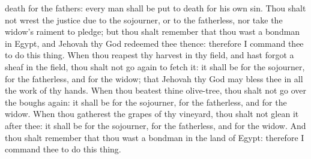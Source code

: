 death for the fathers: every man shall be put to death for his own sin.  Thou shalt not wrest the justice due to the sojourner, or to the fatherless, nor take the widow’s raiment to pledge; but thou shalt remember that thou wast a bondman in Egypt, and Jehovah thy God redeemed thee thence: therefore I command thee to do this thing.  When thou reapest thy harvest in thy field, and hast forgot a sheaf in the field, thou shalt not go again to fetch it: it shall be for the sojourner, for the fatherless, and for the widow; that Jehovah thy God may bless thee in all the work of thy hands. When thou beatest thine olive-tree, thou shalt not go over the boughs again: it shall be for the sojourner, for the fatherless, and for the widow. When thou gatherest the grapes of thy vineyard, thou shalt not glean it after thee: it shall be for the sojourner, for the fatherless, and for the widow. And thou shalt remember that thou wast a bondman in the land of Egypt: therefore I command thee to do this thing. 

